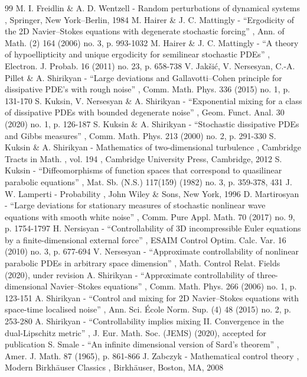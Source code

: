 \documentclass[11pt]{article}
\theoremstyle{plain}
\theoremstyle{definition}
\theoremstyle{plain}
\numberwithin{equation}{section}
\begin{document}
\begin{thebibliography}{99}
 M. I. Freidlin \& A. D. Wentzell - Random perturbations of dynamical systems , Springer, New York–Berlin, 1984
 M. Hairer \& J. C. Mattingly - “Ergodicity of the 2D Navier–Stokes equations with degenerate stochastic forcing” , Ann. of Math. (2) 164 (2006) no. 3, p. 993-1032
 M. Hairer \& J. C. Mattingly - “A theory of hypoellipticity and unique ergodicity for semilinear stochastic PDEs” , Electron. J. Probab. 16 (2011) no. 23, p. 658-738
 V. Jakšić, V. Nersesyan, C.-A. Pillet \& A. Shirikyan - “Large deviations and Gallavotti–Cohen principle for dissipative PDE’s with rough noise” , Comm. Math. Phys. 336 (2015) no. 1, p. 131-170
 S. Kuksin, V. Nersesyan \& A. Shirikyan - “Exponential mixing for a class of dissipative PDEs with bounded degenerate noise” , Geom. Funct. Anal. 30 (2020) no. 1, p. 126-187
 S. Kuksin \& A. Shirikyan - “Stochastic dissipative PDEs and Gibbs measures” , Comm. Math. Phys. 213 (2000) no. 2, p. 291-330
 S. Kuksin \& A. Shirikyan - Mathematics of two-dimensional turbulence , Cambridge Tracts in Math. , vol. 194 , Cambridge University Press, Cambridge, 2012
 S. Kuksin - “Diffeomorphisms of function spaces that correspond to quasilinear parabolic equations” , Mat. Sb. (N.S.) 117(159) (1982) no. 3, p. 359-378, 431
 J. W. Lamperti - Probability , John Wiley \& Sons, New York, 1996
 D. Martirosyan - “Large deviations for stationary measures of stochastic nonlinear wave equations with smooth white noise” , Comm. Pure Appl. Math. 70 (2017) no. 9, p. 1754-1797
 H. Nersisyan - “Controllability of 3D incompressible Euler equations by a finite-dimensional external force” , ESAIM Control Optim. Calc. Var. 16 (2010) no. 3, p. 677-694
 V. Nersesyan - “Approximate controllability of nonlinear parabolic PDEs in arbitrary space dimension” , Math. Control Relat. Fields (2020), under revision
 A. Shirikyan - “Approximate controllability of three-dimensional Navier–Stokes equations” , Comm. Math. Phys. 266 (2006) no. 1, p. 123-151
 A. Shirikyan - “Control and mixing for 2D Navier–Stokes equations with space-time localised noise” , Ann. Sci. École Norm. Sup. (4) 48 (2015) no. 2, p. 253-280
 A. Shirikyan - “Controllability implies mixing II. Convergence in the dual-Lipschitz metric” , J. Eur. Math. Soc. (JEMS) (2020), accepted for publication
 S. Smale - “An infinite dimensional version of Sard’s theorem” , Amer. J. Math. 87 (1965), p. 861-866
 J. Zabczyk - Mathematical control theory , Modern Birkhäuser Classics , Birkhäuser, Boston, MA, 2008
\end{thebibliography}
\end{document}

